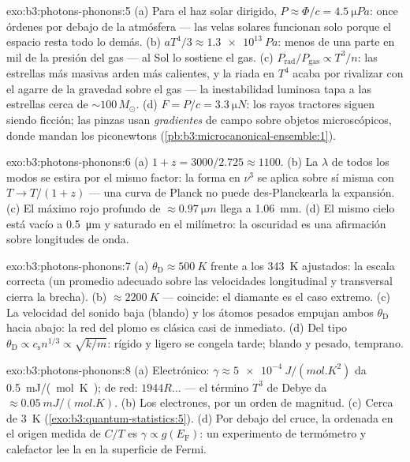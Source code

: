 \begin{solution}{exo:b3:photons-phonons:5}
(a) Para el haz solar dirigido, $P \approx \Phi/c =
\qty{4.5}{\micro Pa}$: once órdenes por debajo de la atmósfera ---
las velas solares funcionan solo porque el espacio resta todo lo demás. (b)
$aT^4/3 \approx \qty{1.3e13}{Pa}$: menos de una parte en
mil de la presión del gas --- al Sol lo sostiene el gas. (c)
$P_{\text{rad}}/P_{\text{gas}} \propto T^3/n$: las estrellas más masivas
arden más calientes, y la riada en $T^4$ acaba por rivalizar con el agarre
de la gravedad sobre el gas --- la inestabilidad luminosa tapa a las estrellas cerca de
$\sim100\,M_\odot$. (d) $F = P/c = \qty{3.3}{\micro N}$:
los rayos tractores siguen siendo ficción; las pinzas usan \emph{gradientes} de campo
sobre objetos microscópicos, donde mandan los piconewtons
(\cref{pb:b3:microcanonical-ensemble:1}).
\end{solution}

\begin{solution}{exo:b3:photons-phonons:6}
(a) $1 + z = 3000/2.725 \approx 1100$. (b) La $\lambda$ de todos los modos
se estira por el mismo factor: la forma en $\nu^3$ se aplica sobre sí misma
con $T \to T/(1+z)$ --- una curva de Planck no puede des-Planckearla la
expansión. (c) El máximo rojo profundo de $\approx\qty{0.97}{\micro m}$
llega a \qty{1.06}{mm}. (d) El mismo cielo está vacío a
\qty{0.5}{\micro m} y saturado en el milímetro: la oscuridad es una
afirmación sobre longitudes de onda.
\end{solution}

\begin{solution}{exo:b3:photons-phonons:7}
(a) $\theta_{\text{D}} \approx \qty{500}{K}$ frente a los
\qty{343}{K} ajustados: la escala correcta (un promedio adecuado sobre las
velocidades longitudinal y transversal cierra la brecha). (b) $\approx\qty{2200}{K}$ ---
coincide: el diamante es el caso extremo. (c) La velocidad del sonido baja (blando)
y los átomos pesados empujan ambos $\theta_{\text{D}}$ hacia abajo: la red del plomo
es clásica casi de inmediato. (d) Del tipo $\theta_{\text{D}} \propto
c_{\text{s}}n^{1/3} \propto \sqrt{k/m}$: rígido y ligero
se congela tarde; blando y pesado, temprano.
\end{solution}

\begin{solution}{exo:b3:photons-phonons:8}
(a) Electrónico: $\gamma \approx \qty{5e-4}{J/(mol.K^2)}$ da
\qty{0.5}{mJ/(mol.K)}; de red: $1944R\dots$ --- el término $T^3$
de Debye da $\approx\qty{0.05}{mJ/(mol.K)}$. (b) Los electrones, por un
orden de magnitud. (c) Cerca de \qty{3}{K}
(\cref{exo:b3:quantum-statistics:5}). (d) Por debajo del cruce, la
ordenada en el origen medida de $C/T$ es $\gamma \propto g(E_{\text{F}})$: un
experimento de termómetro y calefactor lee la  en la
superficie de Fermi.
\end{solution}

